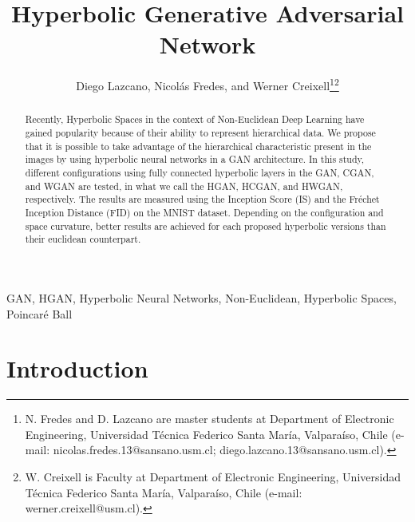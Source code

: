 \documentclass[journal]{IEEEtran}
\begin{document}
\title{Hyperbolic Generative Adversarial Network}

\author{Diego Lazcano,
        Nicol\'as Fredes,
        and Werner Creixell\thanks{N. Fredes and D. Lazcano are master students at Department of Electronic Engineering, Universidad Técnica Federico Santa María, Valparaíso, Chile (e-mail: nicolas.fredes.13@sansano.usm.cl; diego.lazcano.13@sansano.usm.cl).}\thanks{W. Creixell is Faculty at Department of Electronic Engineering, Universidad Técnica Federico Santa María, Valparaíso, Chile (e-mail: werner.creixell@usm.cl).}}

\maketitle
\begin{abstract}
Recently, Hyperbolic Spaces in the context of Non-Euclidean Deep Learning have gained popularity because of their ability to represent hierarchical data. We propose that it is possible to take advantage of the hierarchical characteristic present in the images by using hyperbolic neural networks in a GAN architecture. In this study, different configurations using fully connected hyperbolic layers in the GAN, CGAN, and WGAN are tested, in what we call the HGAN, HCGAN, and HWGAN, respectively. The results are measured using the Inception Score (IS) and the Fr\'echet Inception Distance (FID) on the MNIST dataset. Depending on the configuration and space curvature, better results are achieved for each proposed hyperbolic versions than their euclidean counterpart.
\end{abstract}




\begin{IEEEkeywords}
GAN, HGAN, Hyperbolic Neural Networks, Non-Euclidean, Hyperbolic Spaces, Poincaré Ball
\end{IEEEkeywords}

\section{Introduction}
\end{document}
